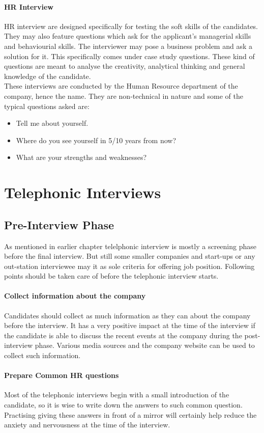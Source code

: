 \documentclass[a4paper,12pt]{report}
\begin{document}
\subsubsection{HR Interview}
HR interview are designed specifically for testing the soft skills of the candidates. They may also feature questions
which ask for the applicant's managerial skills and behaviourial skills. The interviewer may pose a business problem 
and ask a solution for it. This specifically comes under case study questions. These kind of questions are meant to
analyse the creativity, analytical thinking and general knowledge of the candidate.\\
These interviews are conducted by the Human Resource department of the company, hence the name. They are non-technical 
in nature and some of the typical questions asked are:
\begin{itemize}
 \item Tell me about yourself.
 \item Where do you see yourself in 5/10 years from now?
 \item What are your strengths and weaknesses?
\end{itemize}

\chapter{Telephonic Interviews}
\section{Pre-Interview Phase}
As mentioned in earlier chapter telelphonic interview is mostly a screening phase before the final interview. But still some
smaller companies and start-ups or any out-station interviewee may it as sole criteria for offering job position. Following points should
be taken care of before the telephonic interview starts.
\subsubsection{Collect information about the company}
Candidates should collect as much information as they can about the company before the interview. It has
a very positive impact at the time of the interview if the candidate is able to discuss the recent events at
the company during the post-interview phase. Various media sources and the company website can be used to
collect such information.
\subsubsection{Prepare Common HR questions}
Most of the telephonic interviews begin with a small introduction of the candidate, so it is wise to write
down the answers to such common question. Practising giving these answers in front of a mirror will certainly
help reduce the anxiety and nervousness at the time of the interview.
\end{document}
